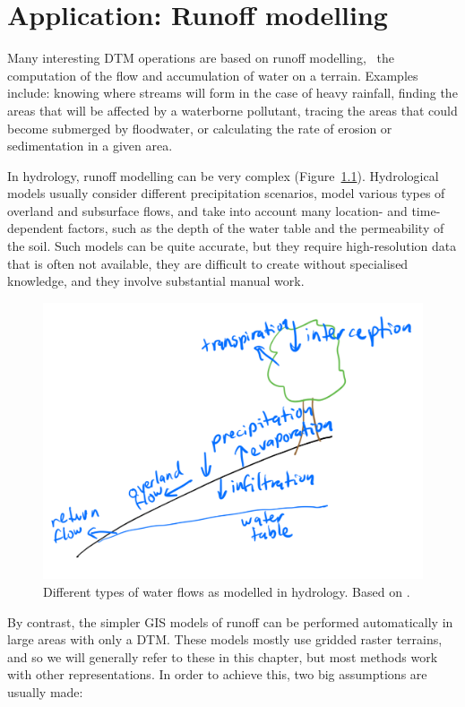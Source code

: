 
\graphicspath{{runoff/}}


\nobibliography*


\chapter{Application: Runoff modelling}

Many interesting DTM operations are based on runoff modelling, \ie\ the computation of the flow and accumulation of water on a terrain.
Examples include: knowing where streams will form in the case of heavy rainfall, finding the areas that will be affected by a waterborne pollutant, tracing the areas that could become submerged by floodwater, or calculating the rate of erosion or sedimentation in a given area.

In hydrology, runoff modelling can be very complex (Figure~\ref{fig:hydrology}).
Hydrological models usually consider different precipitation scenarios, model various types of overland and subsurface flows, and take into account many location- and time-dependent factors, such as the depth of the water table and the permeability of the soil.
Such models can be quite accurate, but they require high-resolution data that is often not available, they are difficult to create without specialised knowledge, and they involve substantial manual work.

\begin{figure}[htbp]
\centering
\includegraphics[width=0.75\linewidth]{figs/hydrology.pdf}
\caption{Different types of water flows as modelled in hydrology. Based on \citet{Beven12}.}%
\label{fig:hydrology}
\end{figure}

By contrast, the simpler GIS models of runoff can be performed automatically in large areas with only a DTM\@.
These models mostly use gridded raster terrains, and so we will generally refer to these in this chapter, but most methods work with other representations.
In order to achieve this, two big assumptions are usually made:

